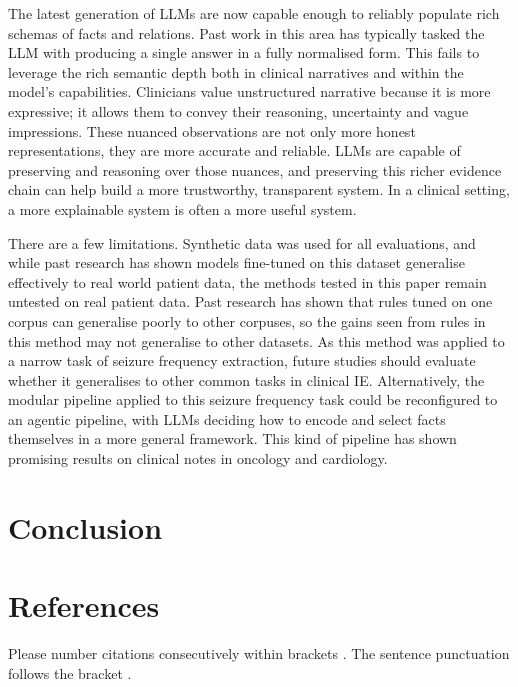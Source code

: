 \documentclass[conference]{IEEEtran}
\begin{document}
The latest generation of LLMs are now capable enough 
to reliably populate rich schemas of facts and relations.
Past work in this area has typically tasked the LLM with 
producing a single answer in a fully normalised form\cite{b2}. 
This fails to leverage the rich semantic depth both in 
clinical narratives and within the model's capabilities.
Clinicians value unstructured narrative because it is 
more expressive; it allows them to convey their 
reasoning, uncertainty and vague impressions. These
nuanced observations are not only more honest
representations, they are more accurate and reliable\cite{b2}. 
LLMs are capable of preserving and reasoning
over those nuances, and preserving this richer evidence
chain can help build a more trustworthy, transparent 
system. In a clinical setting, a more explainable 
system is often a more useful system\cite{b2}.

There are a few limitations. Synthetic
data was used for all evaluations, and while past 
research has shown models fine-tuned on this dataset
generalise effectively to real world patient data\cite{b2},
the methods tested in this paper remain untested on 
real patient data. Past research has shown that rules
tuned on one corpus can generalise poorly to other 
corpuses, so the gains seen from rules in this method
may not generalise to other datasets. As this method 
was applied to a narrow task of seizure frequency 
extraction, future studies should evaluate whether 
it generalises to other common tasks in clinical IE. 
Alternatively, the modular pipeline applied to this 
seizure frequency task could be reconfigured to an
agentic pipeline, with LLMs deciding how to encode 
and select facts themselves in a more general 
framework. This kind of pipeline has shown promising 
results on clinical notes in oncology\cite{b2} and 
cardiology\cite{b2}.

\section{Conclusion}

\section*{References}

Please number citations consecutively within brackets \cite{b1}. The 
sentence punctuation follows the bracket \cite{b2}. 
\end{document}
